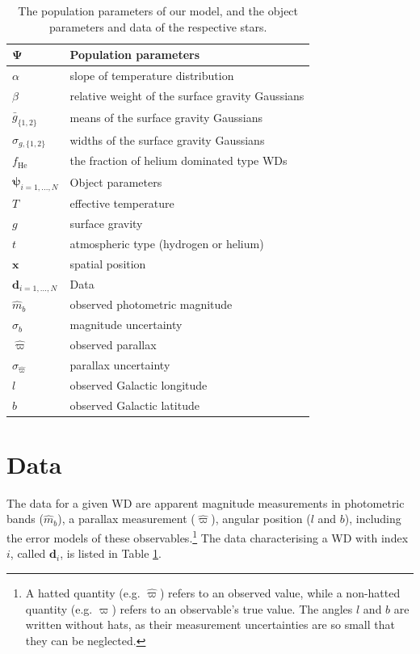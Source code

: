 \documentclass[fleqn,usenatbib]{mnras}
\newcommand{\popp}{\boldsymbol{\Psi}}
\newcommand{\objp}{\boldsymbol{\psi}}
\newcommand{\data}{\mathbf{d}}
\newcommand{\Teff}{T}
\newcommand{\logg}{g}
\begin{document}
\begin{table}
	\centering
	\caption{The population parameters of our model, and the object parameters and data of the respective stars.}
	\label{tab:parameters}
    \begin{tabular}{l l}
		\hline
		$\popp$  & Population parameters \\
		\hline
		$\alpha$ & slope of temperature distribution \\
		$\beta$ & relative weight of the surface gravity Gaussians \\
		$\bar{g}_{\{1,2\}}$ & means of the surface gravity Gaussians \\
		$\sigma_{g,\{1,2\}}$ & widths of the surface gravity Gaussians \\
		$f_\text{He}$ & the fraction of helium dominated type WDs \\
        \hline
        $\objp_{i=1,...,N}$  & Object parameters \\
        \hline
        $\Teff$ & effective temperature \\
        $\logg$ & surface gravity \\
        $t$ & atmospheric type (hydrogen or helium) \\
        $\mathbf{x}$ & spatial position  \\
        \hline
        $\data_{i=1,...,N}$ & Data \\
        \hline
        $\hat{m}_b$ & observed photometric magnitude \\
        $\sigma_b$ & magnitude uncertainty \\
        $\hat{\varpi}$ & observed parallax \\
        $\sigma_{\hat{\varpi}}$ & parallax uncertainty \\
        $l$ & observed Galactic longitude \\
        $b$ & observed Galactic latitude \\
		\hline
	\end{tabular}
\end{table}




\section{Data}\label{sec:data}

The data for a given WD are apparent magnitude measurements in photometric bands ($\hat{m}_b$), a parallax measurement ($\hat{\varpi}$), angular position ($l$ and $b$), including the error models of these observables.\footnote{A hatted quantity (e.g. $\hat{\varpi}$) refers to an observed value, while a non-hatted quantity (e.g. $\varpi$) refers to an observable's true value. The angles $l$ and $b$ are written without hats, as their measurement uncertainties are so small that they can be neglected.} The data characterising a WD with index $i$, called $\data_i$, is listed in Table \ref{tab:parameters}.
\end{document}
